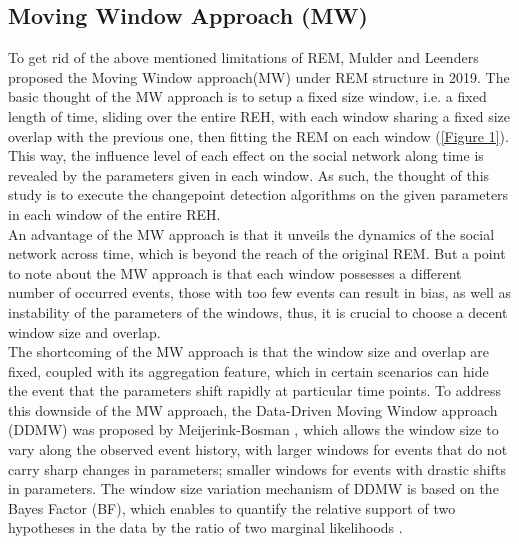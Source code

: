 \documentclass[]{interact}
\theoremstyle{plain}%
\theoremstyle{definition}
\theoremstyle{remark}
\begin{document}
{	\subsection{Moving Window Approach (MW)}
	
	\hspace{0.2cm} To get rid of the above mentioned limitations of REM, Mulder and Leenders proposed the Moving Window approach(MW) under REM structure in 2019\cite{mulderModelingEvolutionInteraction2019}. The basic thought of the MW approach is to setup a fixed size window, i.e. a fixed length of time, sliding over the entire REH, with each window sharing a fixed size overlap with the previous one, then fitting the REM on each window (\autoref{Figure 1}). This way, the influence level of each effect on the social network along time is revealed by the parameters given in each window. As such, the thought of this study is to execute the changepoint detection algorithms on the given parameters in each window of the entire REH. \\ 
	
	An advantage of the MW approach is that it unveils the dynamics of the social network across time, which is beyond the reach of the original REM. But a point to note about the MW approach is that each window possesses a different number of occurred events, those with too few events can result in bias, as well as instability of the parameters of the windows\cite{mulderModelingEvolutionInteraction2019}, thus, it is crucial to choose a decent window size and overlap. \\
	
	The shortcoming of the MW approach is that the window size and overlap are fixed, coupled with its aggregation feature, which in certain scenarios can hide the event that the parameters shift rapidly at particular time points. To address this downside of the MW approach, the Data-Driven Moving Window approach (DDMW) was proposed by Meijerink-Bosman \cite{meijerink-bosmanDynamicRelationalEvent2022}, which allows the window size to vary along the observed event history, with larger windows for events that do not carry sharp changes in parameters; smaller windows for events with drastic shifts in parameters. The window size variation mechanism of DDMW is based on the Bayes Factor (BF), which enables to quantify the relative support of two hypotheses in the data by the ratio of two marginal likelihoods \cite{guApproximatedAdjustedFractional2018}. \\
	
}
\end{document}
